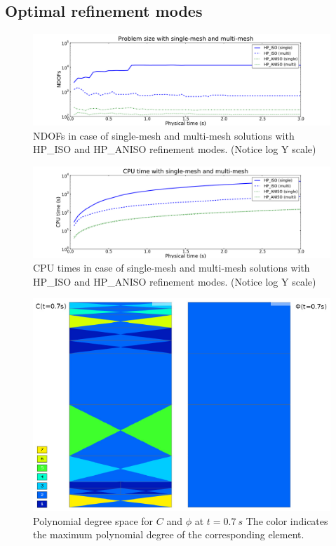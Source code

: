 \subsection{Optimal refinement modes}

\begin{figure}[!ht]
  \begin{centering}
  \includegraphics[width=\columnwidth]{singlemulti_dof}
  \caption{\label{fig:singlemultidof} NDOFs in case 
  of single-mesh and multi-mesh solutions with HP\_ISO
  and HP\_ANISO refinement modes. (Notice log Y scale)}
  \end{centering}
\end{figure}

\begin{figure}[!ht]
  \begin{centering}
  \includegraphics[width=\columnwidth]{singlemulti_cpu}
  \caption{\label{fig:singlemulticpu} CPU times in case
  of single-mesh and multi-mesh solutions with HP\_ISO
  and HP\_ANISO refinement modes. (Notice log Y scale)}
  \end{centering}
\end{figure}

\begin{figure}[!ht]
  \begin{centering}
  \includegraphics[width=.75\columnwidth]{poly}
  \caption{\label{fig:poly} Polynomial degree space
  for $C$ and $\phi$ at $t=0.7\ s$ The color indicates
  the maximum polynomial degree of the corresponding element.}
  \end{centering}
\end{figure}

